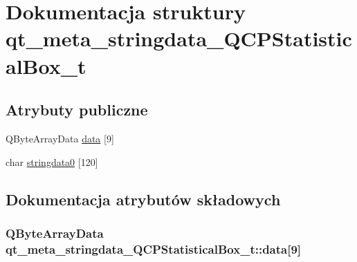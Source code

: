 \hypertarget{structqt__meta__stringdata___q_c_p_statistical_box__t}{}\section{Dokumentacja struktury qt\+\_\+meta\+\_\+stringdata\+\_\+\+Q\+C\+P\+Statistical\+Box\+\_\+t}
\label{structqt__meta__stringdata___q_c_p_statistical_box__t}
\subsection*{Atrybuty publiczne}
\begin{DoxyCompactItemize}
\item 
Q\+Byte\+Array\+Data \hyperlink{structqt__meta__stringdata___q_c_p_statistical_box__t_a4da073c461b75439babf89f1a883b091}{data} \mbox{[}9\mbox{]}
\item 
char \hyperlink{structqt__meta__stringdata___q_c_p_statistical_box__t_a1cda43a559b6896254cc1ae2ff88fe83}{stringdata0} \mbox{[}120\mbox{]}
\end{DoxyCompactItemize}


\subsection{Dokumentacja atrybutów składowych}
\subsubsection[{\texorpdfstring{data}{data}}]{\setlength{\rightskip}{0pt plus 5cm}Q\+Byte\+Array\+Data qt\+\_\+meta\+\_\+stringdata\+\_\+\+Q\+C\+P\+Statistical\+Box\+\_\+t\+::data\mbox{[}9\mbox{]}}\hypertarget{structqt__meta__stringdata___q_c_p_statistical_box__t_a4da073c461b75439babf89f1a883b091}{}\label{structqt__meta__stringdata___q_c_p_statistical_box__t_a4da073c461b75439babf89f1a883b091}
